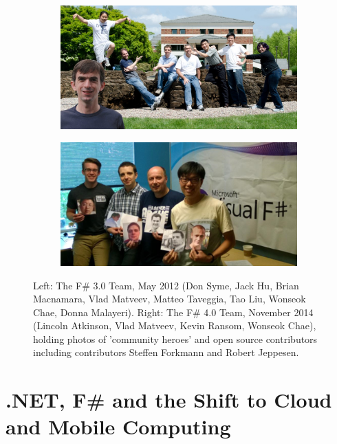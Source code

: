 \documentclass[acmsmall,screen]{acmart}
\begin{document}
\begin{figure}

  \centering
  \begin{subfigure}[b]{0.48\linewidth}
    \includegraphics[width=\linewidth]{team-2012.jpg}
  \end{subfigure}
  \begin{subfigure}[b]{0.48\linewidth}
    \includegraphics[width=\linewidth]{team-2014.png}
  \end{subfigure}
   \caption{Left: The F\# 3.0 Team, May 2012 (Don Syme, Jack Hu, Brian Macnamara, Vlad Matveev, Matteo Taveggia, Tao Liu, Wonseok Chae, Donna Malayeri).
Right: The F\# 4.0 Team, November 2014  (Lincoln Atkinson, Vlad Matveev, Kevin Ransom, Wonseok Chae), holding photos of 'community heroes' and open source contributors
including contributors Steffen Forkmann and Robert Jeppesen.}
  \label{fig:team-2012-2014}

\end{figure}




\section*{.NET, F\# and the Shift to Cloud and Mobile Computing}
\end{document}
